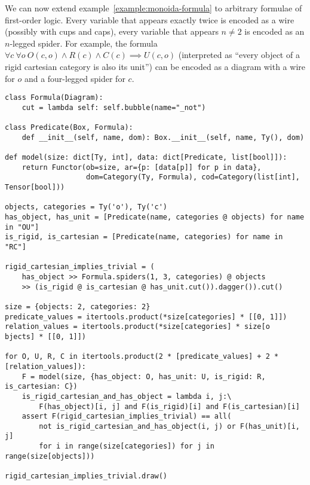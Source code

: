 \begin{example}
We can now extend example~\ref{example:monoida-formula} to arbitrary formulae of first-order logic.
Every variable that appears exactly twice is encoded as a wire (possibly with cups and caps), every variable that appears $n \neq 2$ is encoded as an $n$-legged spider.
For example, the formula $\forall c \ \forall o \ O(c, o) \land R(c) \land C(c) \implies U(c, o)$ (interpreted as ``every object of a rigid cartesian category is also its unit'') can be encoded as a diagram with a wire for $o$ and a four-legged spider for $c$.

\begin{verbatim}
class Formula(Diagram):
    cut = lambda self: self.bubble(name="_not")

class Predicate(Box, Formula):
    def __init__(self, name, dom): Box.__init__(self, name, Ty(), dom)

def model(size: dict[Ty, int], data: dict[Predicate, list[bool]]):
    return Functor(ob=size, ar={p: [data[p]] for p in data},
                   dom=Category(Ty, Formula), cod=Category(list[int], Tensor[bool]))

objects, categories = Ty('o'), Ty('c')
has_object, has_unit = [Predicate(name, categories @ objects) for name in "OU"]
is_rigid, is_cartesian = [Predicate(name, categories) for name in "RC"]

rigid_cartesian_implies_trivial = (
    has_object >> Formula.spiders(1, 3, categories) @ objects
    >> (is_rigid @ is_cartesian @ has_unit.cut()).dagger()).cut()

size = {objects: 2, categories: 2}
predicate_values = itertools.product(*size[categories] * [[0, 1]])
relation_values = itertools.product(*size[categories] * size[o  bjects] * [[0, 1]])

for O, U, R, C in itertools.product(2 * [predicate_values] + 2 * [relation_values]):
    F = model(size, {has_object: O, has_unit: U, is_rigid: R, is_cartesian: C})
    is_rigid_cartesian_and_has_object = lambda i, j:\
        F(has_object)[i, j] and F(is_rigid)[i] and F(is_cartesian)[i]
    assert F(rigid_cartesian_implies_trivial) == all(
        not is_rigid_cartesian_and_has_object(i, j) or F(has_unit)[i, j]
        for i in range(size[categories]) for j in range(size[objects]))

rigid_cartesian_implies_trivial.draw()
\end{verbatim}

\end{example}


